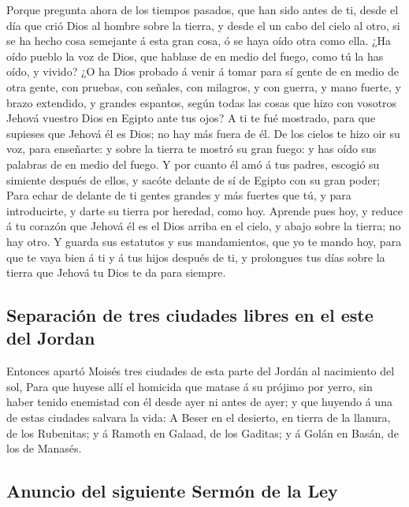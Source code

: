  Porque pregunta ahora de los tiempos pasados, que han
sido antes de ti, desde el día que crió Dios al hombre sobre la tierra,
y desde el un cabo del cielo al otro, si se ha hecho cosa semejante á
esta gran cosa, ó se haya oído otra como ella.  ¿Ha oído
pueblo la voz de Dios, que hablase de en medio del fuego, como tú la has
oído, y vivido?  ¿O ha Dios probado á venir á tomar para
sí gente de en medio de otra gente, con pruebas, con señales, con
milagros, y con guerra, y mano fuerte, y brazo extendido, y grandes
espantos, según todas las cosas que hizo con vosotros Jehová vuestro
Dios en Egipto ante tus ojos?  A ti te fué mostrado, para
que supieses que Jehová él es Dios; no hay más fuera de él.
 De los cielos te hizo oir su voz, para enseñarte: y
sobre la tierra te mostró su gran fuego: y has oído sus palabras de en
medio del fuego.  Y por cuanto él amó á tus padres,
escogió su simiente después de ellos, y sacóte delante de sí de Egipto
con su gran poder;  Para echar de delante de ti gentes
grandes y más fuertes que tú, y para introducirte, y darte su tierra por
heredad, como hoy.  Aprende pues hoy, y reduce á tu
corazón que Jehová él es el Dios arriba en el cielo, y abajo sobre la
tierra; no hay otro.  Y guarda sus estatutos y sus
mandamientos, que yo te mando hoy, para que te vaya bien á ti y á tus
hijos después de ti, y prolongues tus días sobre la tierra que Jehová tu
Dios te da para siempre.

\hypertarget{separaciuxf3n-de-tres-ciudades-libres-en-el-este-del-jordan}{%
\subsection{Separación de tres ciudades libres en el este del
Jordan}\label{separaciuxf3n-de-tres-ciudades-libres-en-el-este-del-jordan}}

 Entonces apartó Moisés tres ciudades de esta parte del
Jordán al nacimiento del sol,  Para que huyese allí el
homicida que matase á su prójimo por yerro, sin haber tenido enemistad
con él desde ayer ni antes de ayer; y que huyendo á una de estas
ciudades salvara la vida:  A Beser en el desierto, en
tierra de la llanura, de los Rubenitas; y á Ramoth en Galaad, de los
Gaditas; y á Golán en Basán, de los de Manasés.

\hypertarget{anuncio-del-siguiente-sermuxf3n-de-la-ley}{%
\subsection{Anuncio del siguiente Sermón de la
Ley}\label{anuncio-del-siguiente-sermuxf3n-de-la-ley}}

